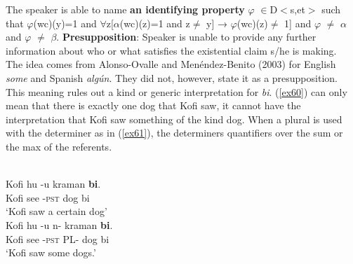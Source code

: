 \documentclass[output=paper,
modfonts
]{langsci/langscibook}
\begin{document}
\ex \label{51} The speaker is able to name \textbf{an identifying property} $\varphi$ $\in$D$<$s,et$>$ such that $\varphi$(wc)(y)=1 and $\forall$z[$\alpha$(wc)(z)=1 and z$\neq$ y] → $\varphi$(wc)(z)$\neq$ 1] and $\varphi$ $\neq$ $\alpha$ and $\varphi$ $\neq$ $\beta$.
\ex \textbf{Presupposition}: Speaker is unable to provide any further information about who or what satisfies the existential claim s/he is making.\\ The idea comes from Alonso-Ovalle and Menéndez-Benito (2003) for English \emph{some} and Spanish \emph{alg\'un}. They did not, however, state it as a presupposition.  
\z \z This meaning rules out a kind or generic interpretation for \emph{bi}. (\ref{ex60}) can only mean that there is exactly one dog that Kofi saw, it cannot have the interpretation that Kofi saw something of the kind dog. When a plural is used with the determiner as in (\ref{ex61}), the determiners quantifiers over the sum or the max of the referents.

\ea {}\\
\ea\label{ex60}
\gll Kofi hu -u kraman \textbf{bi}.\\
Kofi see -\textsc{pst} dog bi\\
\glt `Kofi saw a certain dog'\\
	
\ex \label{ex61}
\gll Kofi hu -u n-  kraman \textbf{bi}.\\
     Kofi see -\textsc{pst} PL- dog bi\\
\glt     `Kofi saw some dogs.' 
\end{document}
